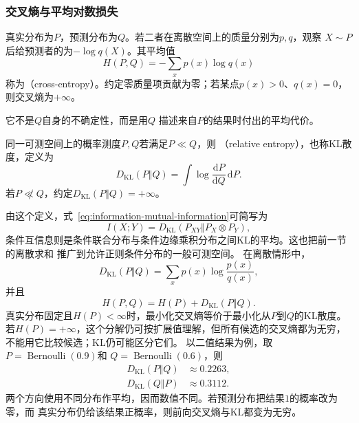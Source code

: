 \subsubsection{交叉熵与平均对数损失}
\begin{definition}[离散交叉熵]
  \label{def:information-cross-entropy}
真实分布为\(P\)，预测分布为\(Q\)。若二者在离散空间上的质量分别为\(p,q\)，观察
\(X\sim P\)后给预测者的为\(-\log q(X)\)。其平均值
\begin{equation}
  H(P,Q)
  =
  -\sum_xp(x)\log q(x)
  \label{eq:information-cross-entropy}
\end{equation}
称为（cross-entropy）。约定零质量项贡献为零；若某点\(p(x)>0\)、\(q(x)=0\)，则交叉熵为\(+\infty\)。
\end{definition}
它不是\(Q\)自身的不确定性，而是用\(Q\)
描述来自\(P\)的结果时付出的平均代价。
\begin{definition}[相对熵]
\label{def:information-kl-divergence}
同一可测空间上的概率测度\(P,Q\)若满足\(P\ll Q\)，则
（relative entropy），也称KL散度，定义为
\begin{equation}
  D_{\mathrm{KL}}(P\Vert Q)
  =
  \int\log\frac{\mathrm{d}P}{\mathrm{d}Q}\,\mathrm{d}P.
  \label{eq:information-kl-divergence}
\end{equation}
若\(P\not\ll Q\)，约定\(D_{\mathrm{KL}}(P\Vert Q)=+\infty\)。
\end{definition}
由这个定义，式~\eqref{eq:information-mutual-information}可简写为
\[
  I(X;Y)
  =
  D_{\mathrm{KL}}(P_{XY}\Vert P_X\otimes P_Y),
\]
条件互信息则是条件联合分布与条件边缘乘积分布之间KL的平均。这也把前一节的离散求和
推广到允许正则条件分布的一般可测空间。
在离散情形中，
\[
  D_{\mathrm{KL}}(P\Vert Q)
  =
  \sum_xp(x)\log\frac{p(x)}{q(x)},
\]
并且
\begin{equation}
  H(P,Q)=H(P)+D_{\mathrm{KL}}(P\Vert Q).
  \label{eq:information-cross-entropy-decomposition}
\end{equation}
真实分布固定且\(H(P)<\infty\)时，最小化交叉熵等价于最小化从\(P\)到\(Q\)的KL散度。
若\(H(P)=+\infty\)，这个分解仍可按扩展值理解，但所有候选的交叉熵都为无穷，
不能用它比较候选；KL仍可能区分它们。
以二值结果为例，取\(P=\operatorname{Bernoulli}(0.9)\)和
\(Q=\operatorname{Bernoulli}(0.6)\)，则
\[
\begin{aligned}
  D_{\mathrm{KL}}(P\Vert Q)&\approx0.2263,\\
  D_{\mathrm{KL}}(Q\Vert P)&\approx0.3112.
\end{aligned}
\]
两个方向使用不同分布作平均，因而数值不同。若预测分布把结果\(1\)的概率改为零，而
真实分布仍给该结果正概率，则前向交叉熵与KL都变为无穷。
